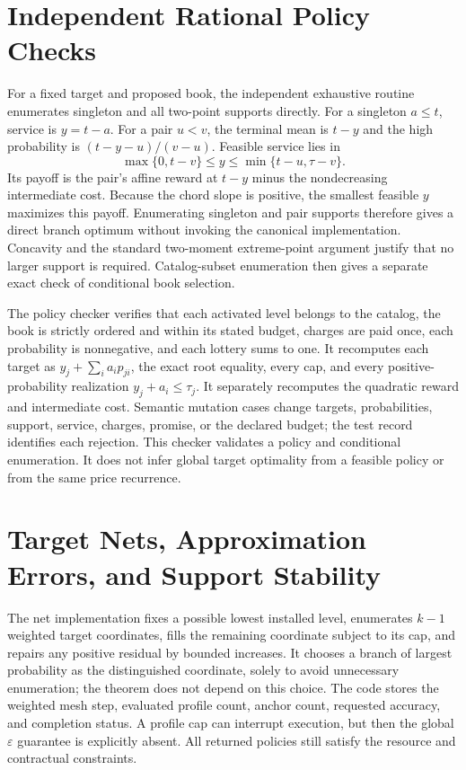 \section{Independent Rational Policy Checks}\label{ec:r45-checks}
For a fixed target and proposed book, the independent exhaustive routine enumerates singleton and all two-point supports directly. For a singleton $a\leq t$, service is $y=t-a$. For a pair $u<v$, the terminal mean is $t-y$ and the high probability is $(t-y-u)/(v-u)$. Feasible service lies in
\[
 \max\{0,t-v\}\leq y\leq\min\{t-u,\tau-v\}.
\]
Its payoff is the pair's affine reward at $t-y$ minus the nondecreasing intermediate cost. Because the chord slope is positive, the smallest feasible $y$ maximizes this payoff. Enumerating singleton and pair supports therefore gives a direct branch optimum without invoking the canonical implementation. Concavity and the standard two-moment extreme-point argument justify that no larger support is required. Catalog-subset enumeration then gives a separate exact check of conditional book selection.

The policy checker verifies that each activated level belongs to the catalog, the book is strictly ordered and within its stated budget, charges are paid once, each probability is nonnegative, and each lottery sums to one. It recomputes each target as $y_j+\sum_i a_i p_{ji}$, the exact root equality, every cap, and every positive-probability realization $y_j+a_i\leq\tau_j$. It separately recomputes the quadratic reward and intermediate cost. Semantic mutation cases change targets, probabilities, support, service, charges, promise, or the declared budget; the test record identifies each rejection. This checker validates a policy and conditional enumeration. It does not infer global target optimality from a feasible policy or from the same price recurrence.

\section{Target Nets, Approximation Errors, and Support Stability}\label{ec:r45-numerics}
The net implementation fixes a possible lowest installed level, enumerates $k-1$ weighted target coordinates, fills the remaining coordinate subject to its cap, and repairs any positive residual by bounded increases. It chooses a branch of largest probability as the distinguished coordinate, solely to avoid unnecessary enumeration; the theorem does not depend on this choice. The code stores the weighted mesh step, evaluated profile count, anchor count, requested accuracy, and completion status. A profile cap can interrupt execution, but then the global $\varepsilon$ guarantee is explicitly absent. All returned policies still satisfy the resource and contractual constraints.


